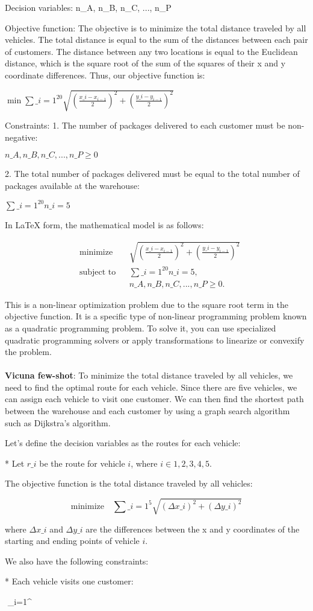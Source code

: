 \documentclass{article}%
\begin{document}
Decision variables:
n\_A, n\_B, n\_C, ..., n\_P

Objective function:
The objective is to minimize the total distance traveled by all vehicles. The total distance is equal to the sum of the distances between each pair of customers. The distance between any two locations is equal to the Euclidean distance, which is the square root of the sum of the squares of their x and y coordinate differences. Thus, our objective function is:

$\min \sum\_{i=1}^{20} \sqrt{(\frac{x\_i - x_{i-1}}{2})^2 + (\frac{y\_i - y_{i-1}}{2})^2}$

Constraints:
1. The number of packages delivered to each customer must be non-negative:

$n\_A, n\_B, n\_C, ..., n\_P \geq 0$

2. The total number of packages delivered must be equal to the total number of packages available at the warehouse:

$\sum\_{i=1}^{20} n\_i = 5$

In LaTeX form, the mathematical model is as follows:

\[
\begin{aligned}
& \text{minimize} && \sqrt{(\frac{x\_i - x_{i-1}}{2})^2 + (\frac{y\_i - y_{i-1}}{2})^2} \\
& \text{subject to} && \sum\_{i=1}^{20} n\_i = 5, \\
&&& n\_A, n\_B, n\_C, ..., n\_P \geq 0.
\end{aligned}
\]

This is a non-linear optimization problem due to the square root term in the objective function. It is a specific type of non-linear programming problem known as a quadratic programming problem. To solve it, you can use specialized quadratic programming solvers or apply transformations to linearize or convexify the problem.\\\\%
\textbf{Vicuna few-shot}: To minimize the total distance traveled by all vehicles, we need to find the optimal route for each vehicle. Since there are five vehicles, we can assign each vehicle to visit one customer. We can then find the shortest path between the warehouse and each customer by using a graph search algorithm such as Dijkstra's algorithm.

Let's define the decision variables as the routes for each vehicle:

* Let $r\_i$ be the route for vehicle $i$, where $i \in {1, 2, 3, 4, 5}$.

The objective function is the total distance traveled by all vehicles:

$$
\text{minimize} \quad \sum\_{i=1}^5 \sqrt{(\Delta x\_i)^2 + (\Delta y\_i)^2}
$$

where $\Delta x\_i$ and $\Delta y\_i$ are the differences between the x and y coordinates of the starting and ending points of vehicle $i$.

We also have the following constraints:

* Each vehicle visits one customer:

$$
\sum\_{i=1}^\\\\%
\end{document}
